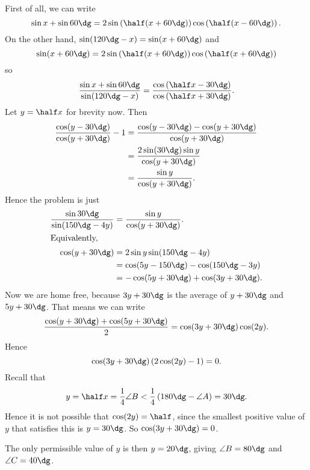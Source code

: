 First of all, we can write
\[ \sin x + \sin 60\dg
  = 2\sin \left( \half (x+60\dg) \right)
  \cos \left( \half (x-60\dg) \right). \]
On the other hand, $\sin (120\dg - x) = \sin(x+60\dg)$ and
\[ \sin (x+60\dg)
  = 2 \sin \left( \half (x+60\dg) \right)
  \cos \left( \half(x+60\dg) \right) \]
so
\[ \frac{\sin x + \sin 60\dg}{\sin (120\dg - x)}
  = \frac{\cos \left( \half x - 30\dg \right)}%
  {\cos \left( \half x + 30\dg \right)}. \]
Let $y = \half x$ for brevity now. Then
\begin{align*}
  \frac{\cos(y-30\dg)}{\cos(y+30\dg)} - 1
  &= \frac{\cos(y-30\dg)-\cos(y+30\dg)}{\cos(y+30\dg)} \\
  &= \frac{2 \sin (30\dg) \sin y}{\cos(y+30\dg)} \\
  &= \frac{\sin y}{\cos (y+30\dg)}.
\end{align*}
Hence the problem is just
\begin{align*}
  \frac{\sin 30\dg}{\sin(150\dg - 4y)} &= \frac{\sin y}{\cos(y+30\dg)}. \\
  \intertext{Equivalently,}
  \cos(y+30\dg) &= 2\sin y \sin (150\dg -4y) \\
  &= \cos(5y-150\dg) - \cos(150\dg-3y) \\
  &= -\cos(5y+30\dg) + \cos(3y+30\dg).
\end{align*}
Now we are home free, because $3y+30\dg$
is the average of $y+30\dg$ and $5y+30\dg$.
That means we can write
\[ \frac{\cos(y+30\dg)+\cos(5y+30\dg)}{2} = \cos(3y+30\dg) \cos(2y). \]
Hence
\[ \cos(3y+30\dg) \left( 2\cos(2y)-1 \right) = 0. \]
Recall that
\[ y = \half x = \frac 14 \angle B
  < \frac 14 \left( 180\dg - \angle A \right) = 30\dg. \]
Hence it is not possible that $\cos(2y) = \half$,
since the smallest positive value of $y$
that satisfies this is $y=30\dg$.
So $\cos (3y+30\dg) = 0$.

The only permissible value of $y$ is then $y = 20\dg$,
giving $\angle B = 80\dg$ and $\angle C = 40\dg$.
